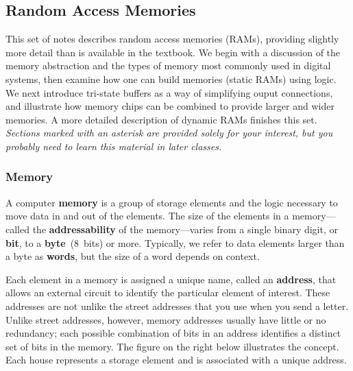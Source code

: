 \classtitle

\subsection{Random Access Memories}

This set of notes describes random access memories (RAMs), providing slightly
more detail than is available in the textbook.  We begin with a discussion
of the memory abstraction and the types of memory most commonly used in
digital systems, then examine how one can build memories (static RAMs) 
using logic.  We next introduce tri-state buffers as a way of simplifying
ouput connections, and illustrate how memory chips can be combined to
provide larger and wider memories.  A more detailed description of dynamic 
RAMs finishes this set.
%
{\em Sections marked with an asterisk are provided solely for your
interest, but you probably need to learn this material in later classes.}\\

\subsubsection{Memory}

A computer {\bf memory} is a group of storage elements and the logic
necessary to move data in and out of the elements.  The size of the
elements in a memory---called the {\bf addressability} of the 
memory---varies from a single binary digit, or {\bf bit},
to a {\bf byte}~(8~bits) or more.  Typically, we refer to data
elements larger than a byte as {\bf words}, but the size of a word
depends on context. 

Each element in a memory is assigned a unique name, called an {\bf
address}, that allows an external circuit to identify the particular
element of interest.  These addresses are not unlike the street
addresses that you use when you send a letter.  Unlike street
addresses, however, memory addresses usually have little or no
redundancy; each possible combination of bits in an address identifies
a distinct set of bits in the memory.  The figure on the right below 
illustrates the concept.  Each house represents a storage element and 
is associated with a unique address.

